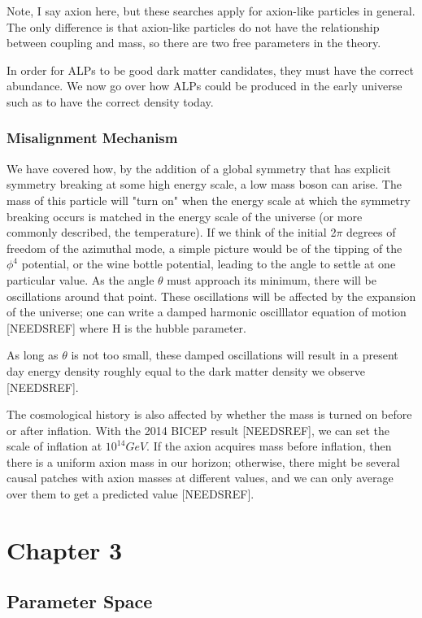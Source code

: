 \documentclass[11pt]{book}
\begin{document}
Note, I say axion here, but these searches apply for axion-like particles in general. The only difference is that axion-like particles do not have the relationship between coupling and mass, so there are two free parameters in the theory.

In order for ALPs to be good dark matter candidates, they must have the correct abundance. We now go over how ALPs could be produced in the early universe such as to have the correct density today.

\subsection{Misalignment Mechanism}

We have covered how, by the addition of a global symmetry that has explicit symmetry breaking at some high energy scale, a low mass boson can arise. The mass of this particle will "turn on" when the energy scale at which the symmetry breaking occurs is matched in the energy scale of the universe (or more commonly described, the temperature). If we think of the initial 2$\pi$ degrees of freedom of the azimuthal mode, a simple picture would be of the tipping of the $\phi^4$ potential, or the wine bottle potential, leading to the angle to settle at one particular value. As the angle $\theta$ must approach its minimum, there will be oscillations around that point. These oscillations will be affected by the expansion of the universe; one can write a damped harmonic oscilllator equation of motion [NEEDSREF] where H is the hubble parameter.

As long as $\theta$ is not too small, these damped oscillations will result in a present day energy density roughly equal to the dark matter density we observe [NEEDSREF].

The cosmological history is also affected by whether the mass is turned on before or after inflation. With the 2014 BICEP result [NEEDSREF], we can set the scale of inflation at $10^{14} GeV$. If the axion acquires mass before inflation, then there is a uniform axion mass in our horizon; otherwise, there might be several causal patches with axion masses at different values, and we can only average over them to get a predicted value [NEEDSREF].

\chapter{Chapter 3}
\section{Parameter Space}
\end{document}
